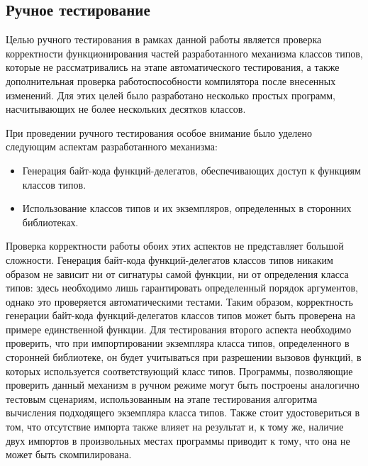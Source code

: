 \subsection{Ручное тестирование}

Целью ручного тестирования в рамках данной работы является проверка корректности функционирования частей разработанного механизма классов типов, которые не рассматривались на этапе автоматического тестирования, а также дополнительная проверка работоспособности компилятора после внесенных изменений. Для этих целей было разработано несколько простых программ, насчитывающих не более нескольких десятков классов. 

При проведении ручного тестирования особое внимание было уделено следующим аспектам разработанного механизма:
\begin{itemize}
    \item Генерация байт-кода функций-делегатов, обеспечивающих доступ к функциям классов типов.
    \item Использование классов типов и их экземпляров, определенных в сторонних библиотеках.
\end{itemize}
Проверка корректности работы обоих этих аспектов не представляет большой сложности. Генерация байт-кода функций-делегатов классов типов никаким образом не зависит ни от сигнатуры самой функции, ни от определения класса типов: здесь необходимо лишь гарантировать определенный порядок аргументов, однако это проверяется автоматическими тестами. Таким образом, корректность генерации байт-кода функций-делегатов классов типов может быть проверена на примере единственной функции. Для тестирования второго аспекта необходимо проверить, что при импортировании экземпляра класса типов, определенного в сторонней библиотеке, он будет учитываться при разрешении вызовов функций, в которых используется соответствующий класс типов. Программы, позволяющие проверить данный механизм в ручном режиме могут быть построены аналогично тестовым сценариям, использованным на этапе тестирования алгоритма вычисления подходящего экземпляра класса типов. Также стоит удостовериться в том, что отсутствие импорта также влияет на результат и, к тому же, наличие двух импортов в произвольных местах программы приводит к тому, что она не может быть скомпилирована.       